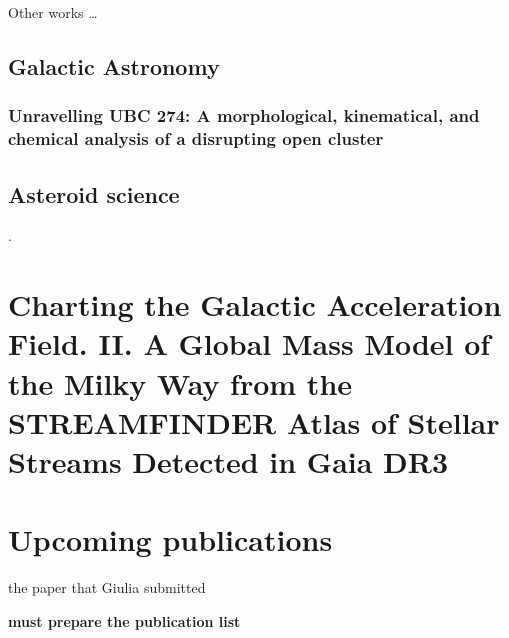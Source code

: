 Other works \dots 
\section{Galactic Astronomy}

\subsection{Unravelling UBC 274: A morphological, kinematical, and chemical analysis of a disrupting open cluster}
\citet{2022A&A...664A..31C}

\section{Asteroid science}
\citet{2023A&A...676A...5F}. \citet{2024A&A...682A..64B}

\chapter{Charting the Galactic Acceleration Field. II. A Global Mass Model of the Milky Way from the STREAMFINDER Atlas of Stellar Streams Detected in Gaia DR3}
\citet{2024ApJ...967...89I}

\chapter{Upcoming publications}
the paper that Giulia submitted 


\textbf{must prepare the publication list}